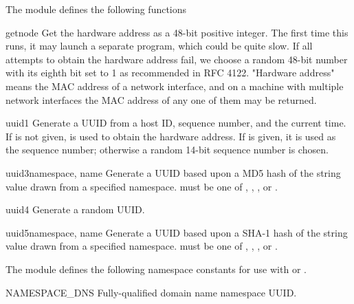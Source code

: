 The  module defines the following functions

\begin{funcdesc}{getnode}{}
Get the hardware address as a 48-bit positive integer.  The first time this
runs, it may launch a separate program, which could be quite slow.  If all
attempts to obtain the hardware address fail, we choose a random 48-bit
number with its eighth bit set to 1 as recommended in RFC 4122.  "Hardware
address" means the MAC address of a network interface, and on a machine
with multiple network interfaces the MAC address of any one of them may
be returned.
\end{funcdesc}

\begin{funcdesc}{uuid1}{}
Generate a UUID from a host ID, sequence number, and the current time.
If  is not given,  is used to obtain the
hardware address.
If  is given, it is used as the sequence number;
otherwise a random 14-bit sequence number is chosen.
\end{funcdesc}

\begin{funcdesc}{uuid3}{namespace, name}
Generate a UUID based upon a MD5 hash of the  string value
drawn from a specified namespace.   
must be one of ,
, ,
or .
\end{funcdesc}

\begin{funcdesc}{uuid4}{}
Generate a random UUID.
\end{funcdesc}

\begin{funcdesc}{uuid5}{namespace, name}
Generate a UUID based upon a SHA-1 hash of the  string value
drawn from a specified namespace.   
must be one of ,
, ,
or .
\end{funcdesc}

The  module defines the following namespace constants
for use with  or .

\begin{datadesc}{NAMESPACE_DNS}
Fully-qualified domain name namespace UUID.
\end{datadesc}

